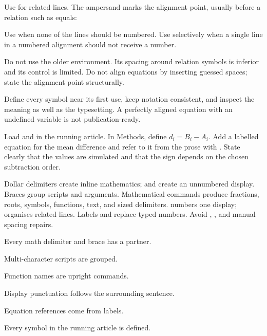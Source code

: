 Use  for related lines. The ampersand marks the alignment point,
usually before a relation such as equals:


Use  when none of the lines should be numbered. Use
 selectively when a single line in a numbered alignment should not
receive a number.

Do not use the older  environment. Its spacing around relation
symbols is inferior and its control is limited. Do not align equations by
inserting guessed spaces; state the alignment point structurally.

\begin{goodpractice}
Define every symbol near its first use, keep notation consistent, and inspect
the meaning as well as the typesetting. A perfectly aligned equation with an
undefined variable is not publication-ready.
\end{goodpractice}

\chapterproject

\begin{miniproject}
Load  and  in the running article. In Methods,
define $d_i=B_i-A_i$. Add a labelled equation for the mean difference and refer
to it from the prose with . State clearly that the values are
simulated and that the sign depends on the chosen subtraction order.
\end{miniproject}

\chaptersummary

Dollar delimiters create inline mathematics; \code{\textbackslash[} and
\code{\textbackslash]} create an unnumbered display. Braces group scripts and
arguments. Mathematical commands produce fractions, roots, symbols, functions,
text, and sized delimiters.  numbers one display; 
organises related lines. Labels and  replace typed numbers.
Avoid \code{\$\$}, , and manual spacing repairs.

\chaptercheck
\begin{chapterchecklist}
  \item Every math delimiter and brace has a partner.
  \item Multi-character scripts are grouped.
  \item Function names are upright commands.
  \item Display punctuation follows the surrounding sentence.
  \item Equation references come from labels.
  \item Every symbol in the running article is defined.
\end{chapterchecklist}

